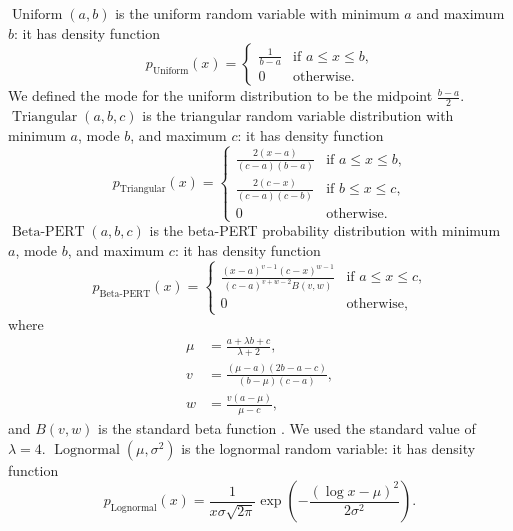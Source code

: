 \documentclass{article}
\DeclareMathOperator{\Uniform}{Uniform}
\DeclareMathOperator{\Triangular}{Triangular}
\DeclareMathOperator{\Lognormal}{Lognormal}
\DeclareMathOperator{\BetaPERT}{Beta-PERT}
\begin{document}
$\Uniform(a, b)$ is the uniform random variable with minimum $a$
and maximum $b$: it has density function
\begin{equation}
  \label{uniform}
  p_{\Uniform}(x) =
  \begin{cases}
    \frac{1}{b - a} & \text{if $a \leq x \leq b$,}
    \\
    0 & \text{otherwise.}
  \end{cases}
\end{equation}
We defined the mode for the uniform distribution to be the midpoint
$\frac{b - a}{2}$.
%
$\Triangular(a, b, c)$ is the triangular random variable
distribution with minimum $a$, mode $b$, and maximum $c$: it has
density function
\begin{equation}
  \label{triangular}
  p_{\Triangular}(x) =
  \begin{cases}
    \frac{2 (x - a)}{(c - a)(b - a)} & \text{if $a \leq x \leq b$,}
    \\
    \frac{2 (c - x)}{(c - a)(c - b)} & \text{if $b \leq x \leq c$,}
    \\
    0 & \text{otherwise.}
  \end{cases}
\end{equation}
$\BetaPERT(a, b, c)$ is the beta-PERT probability distribution
\cite{malcom1959} with minimum $a$, mode $b$, and maximum $c$: it has
density function
\begin{equation}
  \label{betaPERT}
  p_{\BetaPERT}(x) =
  \begin{cases}
    \frac{(x - a)^{v - 1} (c - x)^{w - 1}}{(c - a)^{v + w - 2} B(v, w)}
    & \text{if $a \leq x \leq c$,}
    \\
    0 & \text{otherwise,}
  \end{cases}
\end{equation}
where
\begin{equation}
  \begin{split}
    \mu &= \frac{a + \lambda b + c}{\lambda + 2},
    \\
    v &= \frac{(\mu - a)(2 b - a - c)}{(b - \mu) (c - a)},
    \\
    w &= \frac{v (a - \mu)}{\mu - c},
  \end{split}
\end{equation}
and $B(v, w)$ is the standard beta function \cite[\S 6.2]{davis1972}.
We used the standard value of $\lambda = 4$.
%
$\Lognormal(\mu, \sigma^2)$ is the lognormal random variable: it has
density function
\begin{equation}
  p_{\Lognormal}(x) = \frac{1}{x \sigma \sqrt{2 \pi}}
  \exp\left(- \frac{\left(\log x - \mu\right)^2}{2 \sigma^2}\right).
\end{equation}
\end{document}
